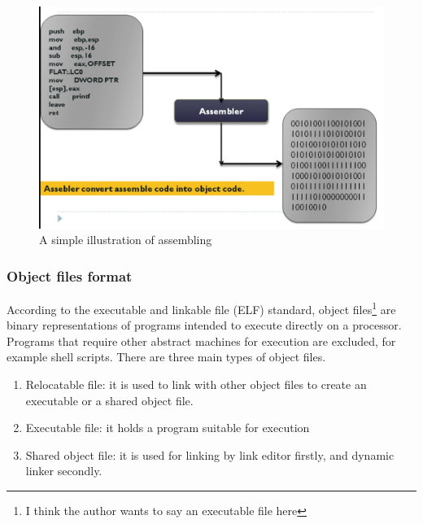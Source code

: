      
            \begin{figure}[H]
                \centering
                \includegraphics[scale = 0.22]
                {Images/concepts/Assembler.png}
                \caption[A simple illustration of assembling]%
                {A simple illustration of assembling\footnotemark}    
                \label{fig:Assembler}
            \end{figure}

        
        \subsubsection{Object files format}
        According to the executable and linkable file (ELF) standard, object files\footnote{I think the author wants to say an executable file here} are binary representations of programs intended to execute directly on a processor\cite{SCO-97}. Programs that require other abstract machines for execution are excluded, for example shell scripts\cite{SCO-97}. There are three main types of object files.
            
          \begin{enumerate}
                \item Relocatable file: it is used to link with other object files to create an executable or a shared object file. 
                \item Executable file: it holds a program suitable for execution
                \item Shared object file: it is used for linking by link editor firstly, and dynamic linker secondly.
           \end{enumerate}
        
